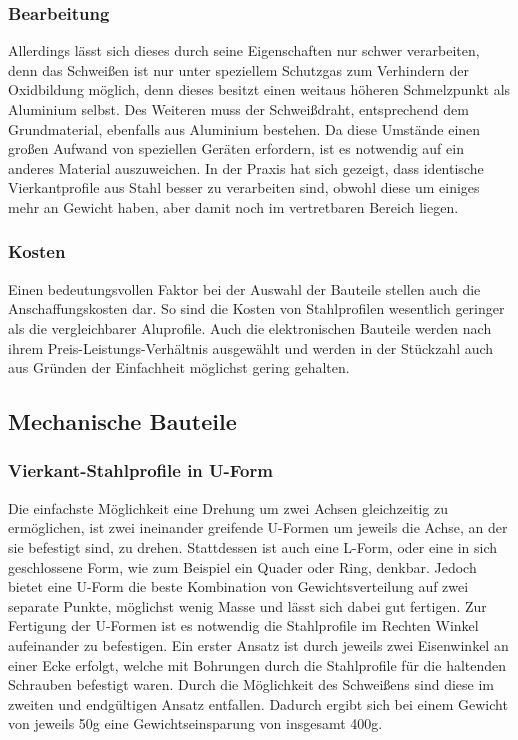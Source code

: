 \documentclass[a4paper, 12pt, bibtotocnumbered, liststotocnumbered]{scrartcl}
\begin{document}
	\subsubsection{Bearbeitung}
	Allerdings lässt sich dieses durch seine Eigenschaften nur schwer verarbeiten, denn das Schweißen ist nur unter speziellem Schutzgas zum Verhindern der Oxidbildung möglich, denn dieses besitzt einen weitaus höheren Schmelzpunkt als Aluminium selbst. Des Weiteren muss der Schweißdraht, entsprechend dem Grundmaterial, ebenfalls aus Aluminium bestehen. Da diese Umstände einen großen Aufwand von speziellen Geräten erfordern, ist es notwendig auf ein anderes Material auszuweichen. In der Praxis hat sich gezeigt, dass identische Vierkantprofile aus Stahl besser zu verarbeiten sind, obwohl diese um einiges mehr an Gewicht haben, aber damit noch im vertretbaren Bereich liegen.

	\subsubsection{Kosten}
	Einen bedeutungsvollen Faktor bei der Auswahl der Bauteile stellen auch die Anschaffungskosten dar. So sind die Kosten von Stahlprofilen wesentlich geringer als die vergleichbarer Aluprofile. Auch die elektronischen Bauteile werden nach ihrem Preis-Leistungs-Verhältnis ausgewählt und werden in der Stückzahl auch aus Gründen der Einfachheit möglichst gering gehalten.

	\subsection{Mechanische Bauteile}
	\subsubsection{Vierkant-Stahlprofile in U-Form}
	Die einfachste Möglichkeit eine Drehung um zwei Achsen gleichzeitig zu ermöglichen, ist zwei ineinander greifende U-Formen um jeweils die Achse, an der sie befestigt sind, zu drehen. Stattdessen ist auch eine L-Form, oder eine in sich geschlossene Form, wie zum Beispiel ein Quader oder Ring, denkbar. Jedoch bietet eine U-Form die beste Kombination von Gewichtsverteilung auf zwei separate Punkte, möglichst wenig Masse und lässt sich dabei gut fertigen.
Zur Fertigung der U-Formen ist es notwendig die Stahlprofile im Rechten Winkel aufeinander zu befestigen. Ein erster Ansatz ist durch jeweils zwei Eisenwinkel an einer Ecke erfolgt, welche mit Bohrungen durch die Stahlprofile für die haltenden Schrauben befestigt waren. Durch die Möglichkeit des Schweißens sind diese im zweiten und endgültigen Ansatz entfallen. Dadurch ergibt sich bei einem Gewicht von jeweils 50g eine Gewichtseinsparung von insgesamt 400g.
\end{document}
